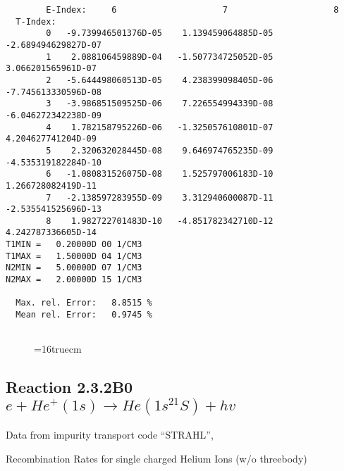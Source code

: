 \documentclass[12pt,dvipdfmx]{article}
\begin{document}
\begin{small}
\begin{verbatim}
        E-Index:     6                     7                     8
  T-Index:
        0   -9.739946501376D-05    1.139459064885D-05   -2.689494629827D-07
        1    2.088106459889D-04   -1.507734725052D-05    3.066201565961D-07
        2   -5.644498060513D-05    4.238399098405D-06   -7.745613330596D-08
        3   -3.986851509525D-06    7.226554994339D-08   -6.046272342238D-09
        4    1.782158795226D-06   -1.325057610801D-07    4.204627741204D-09
        5    2.320632028445D-08    9.646974765235D-09   -4.535319182284D-10
        6   -1.080831526075D-08    1.525797006183D-10    1.266728082419D-11
        7   -2.138597283955D-09    3.312940600087D-11   -2.535541525696D-13
        8    1.982722701483D-10   -4.851782342710D-12    4.242787336605D-14
T1MIN =   0.20000D 00 1/CM3
T1MAX =   1.50000D 04 1/CM3
N2MIN =   5.00000D 07 1/CM3
N2MAX =   2.00000D 15 1/CM3

  Max. rel. Error:   8.8515 %
  Mean rel. Error:   0.9745 %


\end{verbatim}\end{small}
\begin{figure} \label{2.8A0}
\epsfxsize=16truecm 
\end{figure}
\newpage

\subsection{
Reaction 2.3.2B0  $e + He^+(1s) \rightarrow He(1s^21S) + hv$
}
Data from impurity transport code ``STRAHL'', \cite{kn:Behringer}

  Recombination Rates for single charged Helium Ions (w/o threebody)
\end{document}

